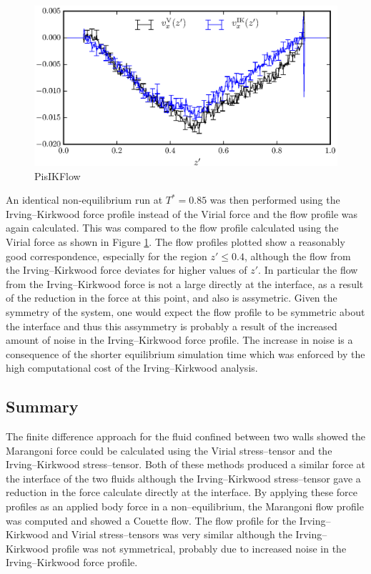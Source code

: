 \begin{figure}[h]
\centering
\includegraphics[scale=0.8]{PisIKFlow}
\caption{PisIKFlow}
\label{PisIKFlow}
\end{figure}
An identical non-equilibrium run at $T^{*} = 0.85$ was then performed using the Irving--Kirkwood force profile instead of the Virial force and the flow profile was again calculated.
This was compared to the flow profile calculated using the Virial force as shown in Figure \ref{PisIKFlow}.
The flow profiles plotted show a reasonably good correspondence, especially for the region $z' \leq 0.4$, although the flow from the Irving--Kirkwood force deviates for higher values of $z'$.
In particular the flow from the Irving--Kirkwood force is not a large directly at the interface, as a result of the reduction in the force at this point, and also is assymetric.
Given the symmetry of the system, one would expect the flow profile to be symmetric about the interface and thus this assymmetry is probably a result of the increased amount of noise in the Irving--Kirkwood force profile.
The increase in noise is a consequence of the shorter equilibrium simulation time which was enforced by the high computational cost of the Irving--Kirkwood analysis.

\subsection{Summary}
The finite difference approach for the fluid confined between two walls showed the Marangoni force could be calculated using the Virial stress--tensor and the Irving--Kirkwood stress--tensor.
Both of these methods produced a similar force at the interface of the two fluids although the Irving--Kirkwood stress--tensor gave a reduction in the force calculate directly at the interface.
By applying these force profiles as an applied body force in a non--equilibrium, the Marangoni flow profile was computed and showed a Couette flow.
The flow profile for the Irving--Kirkwood and Virial stress--tensors was very similar although the Irving--Kirkwood profile was not symmetrical, probably due to increased noise in the Irving--Kirkwood force profile.







